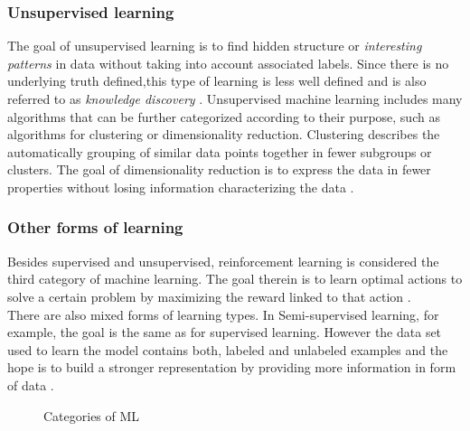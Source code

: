 \subsubsection{Unsupervised learning}
The goal of unsupervised learning is to find hidden structure or \textit{interesting patterns} in data without taking into account associated labels. Since there is no underlying truth defined,this type of learning is less well defined and is also referred to as \textit{knowledge discovery} \cite{Murphy2012}. Unsupervised machine learning includes many algorithms that can be further categorized according to their purpose, such as algorithms for clustering or dimensionality reduction. Clustering describes the automatically grouping of similar data points together in fewer subgroups or clusters. The goal of dimensionality reduction is to express the data in fewer properties without losing information characterizing the data \cite{Cunningham2014}. 
\subsubsection{Other forms of learning}
 Besides supervised and unsupervised, reinforcement learning is considered the third category of machine learning. The goal therein is to learn optimal actions to solve a certain problem by maximizing the reward linked to that action \cite{Murphy2012}.\\
 There are also mixed forms of learning types. In Semi-supervised learning, for example, the goal is the same as for supervised learning. However the data set used to learn the model contains both, labeled and unlabeled examples and the hope is to build a stronger representation by providing more information in form of data \cite{Burkov2019}.  

\begin{figure*}[h]
  \caption{Categories of ML}
  \label{fig1:ml_types}
\end{figure*}

